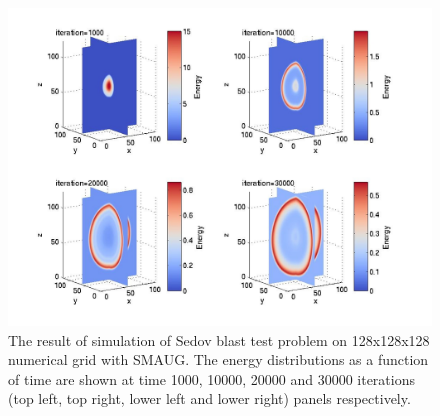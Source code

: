 \begin{figure}[]
\includegraphics[scale=9.0]{figure_b3_sedov3d_pub.jpg}
\caption{The result of simulation of Sedov blast test problem on 128x128x128 numerical grid with SMAUG. The energy distributions as a function of time are shown at time 1000, 10000, 20000 and 30000 iterations (top left, top right, lower left and lower right) panels respectively.}
\end{figure}














